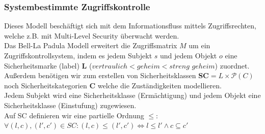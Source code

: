\documentclass[a4paper,12pt,leqno]{article}
\begin{document}
\subsubsection{Systembestimmte Zugriffskontrolle}
Dieses Modell beschäftigt sich mit dem Informationsfluss mittels Zugriffsrechten, welche z.B. mit Multi-Level Security überwacht werden.\\

Das Bell-La Padula Modell erweitert die Zugriffsmatrix $M$ um ein Zugriffskontrollsystem, indem es jedem Subjekt $s$ und jedem Objekt $o$ eine Sicherheitsmarke (label) \textbf{L}  ($vertraulich<geheim<streng$ $geheim$) zuordnet.\\
Außerdem benötigen wir zum erstellen von Sicherheitsklassen \textbf{SC}$=L\times \mathcal{P}(C)$ noch Sicherheitskategorien \textbf{C} welche die Zuständigkeiten modellieren.\\
Jedem Subjekt wird eine Sicherheitsklasse (Ermächtigung) und jedem Objekt eine Sicherheitsklasse (Einstufung) zugewiesen.\\
Auf SC definieren wir eine partielle Ordnung $\leq$:\\ 
$\forall (l,c),(l',c')\in SC:(l,c)\leq (l',c')\Leftrightarrow l\leq l'\wedge c\subseteq c'$\\
\end{document}
